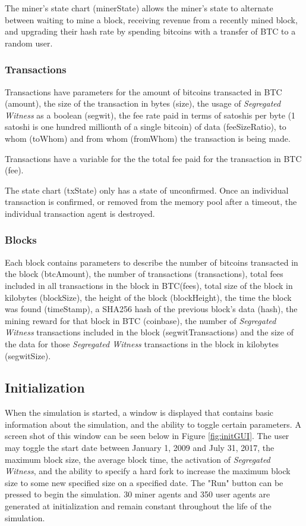 \documentclass[12pt]{report}
\begin{document}
The miner's state chart (minerState) allows the miner's state to alternate between waiting to mine a block, receiving revenue from a recently mined block, and upgrading their hash rate by spending bitcoins with a transfer of BTC to a random user.

\subsubsection{Transactions}
Transactions have parameters for the amount of bitcoins transacted in BTC (amount), the size of the transaction in bytes (size), the usage of \textit{Segregated Witness} as a boolean (segwit), the fee rate paid in terms of satoshis per byte (1 satoshi is one hundred millionth of a single bitcoin) of data (feeSizeRatio), to whom (toWhom) and from whom (fromWhom) the transaction is being made. 

Transactions have a variable for the the total fee paid for the transaction in BTC (fee).
 
The state chart (txState) only has a state of unconfirmed. Once an individual transaction is confirmed, or removed from the memory pool after a timeout, the individual transaction agent is destroyed.

\subsubsection{Blocks}
Each block contains parameters to describe the number of bitcoins transacted in the block (btcAmount), the number of transactions (transactions), total fees included in all transactions in the block in BTC(fees), total size of the block in kilobytes (blockSize), the height of the block (blockHeight), the time the block was found (timeStamp), a SHA256 hash of the previous block's data (hash), the mining reward for that block in BTC (coinbase), the number of \textit{Segregated Witness} transactions included in the block (segwitTransactions) and the size of the data for those \textit{Segregated Witness} transactions in the block in kilobytes (segwitSize).

\subsection{Initialization}

When the simulation is started, a window is displayed that contains basic information about the simulation, and the ability to toggle certain parameters. A screen shot of this window can be seen below in Figure \ref{fig:initGUI}. The user may toggle the start date between January 1, 2009 and July 31, 2017, the maximum block size, the average block time, the activation of \textit{Segregated Witness}, and the ability to specify a hard fork to increase the maximum block size to some new specified size on a specified date. The "Run" button can be pressed to begin the simulation. 30 miner agents and 350 user agents are generated at initialization and remain constant throughout the life of the simulation.
\end{document}

